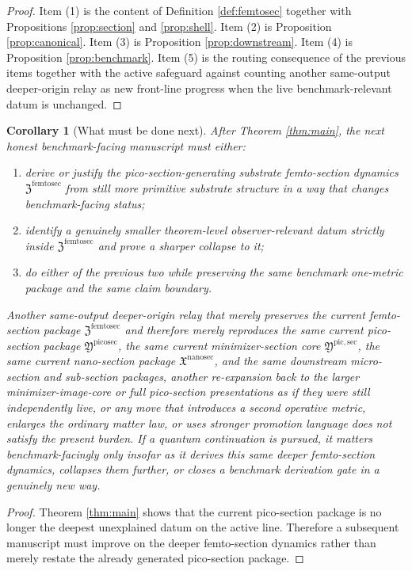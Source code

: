 \documentclass[11pt]{article}
\newcommand{\NanoSectionPackage}{\mathfrak X^{\mathrm{nanosec}}}
\newcommand{\PicoSectionPackage}{\mathfrak Y^{\mathrm{picosec}}}
\newcommand{\PicoMinSectionCore}{\mathfrak Y^{\mathrm{pic,sec}}}
\newcommand{\FemtoSectionPackage}{\mathfrak Z^{\mathrm{femtosec}}}
\newtheorem{corollary}{Corollary}
\begin{document}
\begin{proof}
Item (1) is the content of Definition \ref{def:femtosec} together with Propositions \ref{prop:section} and \ref{prop:shell}. Item (2) is Proposition \ref{prop:canonical}. Item (3) is Proposition \ref{prop:downstream}. Item (4) is Proposition \ref{prop:benchmark}. Item (5) is the routing consequence of the previous items together with the active safeguard against counting another same-output deeper-origin relay as new front-line progress when the live benchmark-relevant datum is unchanged.
\end{proof}

\begin{corollary}[What must be done next]
\label{cor:next}
After Theorem \ref{thm:main}, the next honest benchmark-facing manuscript must either:
\begin{enumerate}
    \item derive or justify the pico-section-generating substrate femto-section dynamics \(\FemtoSectionPackage\) from still more primitive substrate structure in a way that changes benchmark-facing status;
    \item identify a genuinely smaller theorem-level observer-relevant datum strictly inside \(\FemtoSectionPackage\) and prove a sharper collapse to it;
    \item do either of the previous two while preserving the same benchmark one-metric package and the same claim boundary.
\end{enumerate}
Another same-output deeper-origin relay that merely preserves the current femto-section package \(\FemtoSectionPackage\) and therefore merely reproduces the same current pico-section package \(\PicoSectionPackage\), the same current minimizer-section core \(\PicoMinSectionCore\), the same current nano-section package \(\NanoSectionPackage\), and the same downstream micro-section and sub-section packages, another re-expansion back to the larger minimizer-image-core or full pico-section presentations as if they were still independently live, or any move that introduces a second operative metric, enlarges the ordinary matter law, or uses stronger promotion language does not satisfy the present burden. If a quantum continuation is pursued, it matters benchmark-facingly only insofar as it derives this same deeper femto-section dynamics, collapses them further, or closes a benchmark derivation gate in a genuinely new way.
\end{corollary}

\begin{proof}
Theorem \ref{thm:main} shows that the current pico-section package is no longer the deepest unexplained datum on the active line. Therefore a subsequent manuscript must improve on the deeper femto-section dynamics rather than merely restate the already generated pico-section package.
\end{proof}
\end{document}
